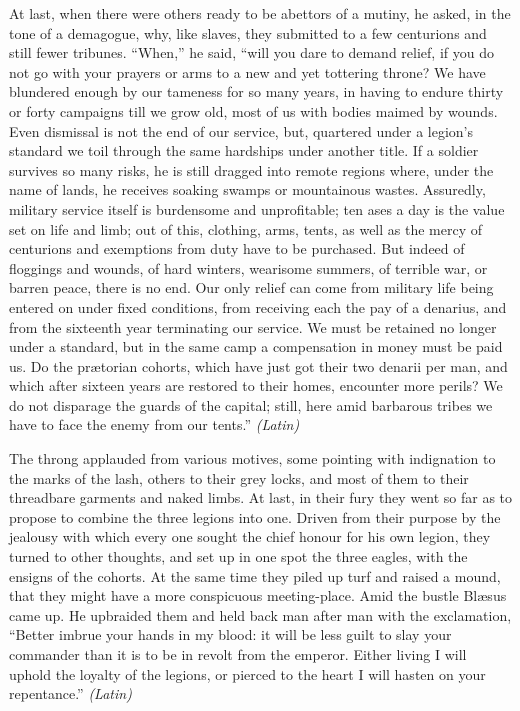 At last, when there were others ready to be abettors of a mutiny, he asked, in the tone of a demagogue, why, like slaves, they submitted to a few centurions and still fewer tribunes. ``When,'' he said, ``will you dare to demand relief, if you do not go with your prayers or arms to a new and yet tottering throne? We have blundered enough by our tameness for so many years, in having to endure thirty or forty campaigns till we grow old, most of us with bodies maimed by wounds. Even dismissal is not the end of our service, but, quartered under a legion's standard we toil through the same hardships under another title. If a soldier survives so many risks, he is still dragged into remote regions where, under the name of lands, he receives soaking swamps or mountainous wastes. Assuredly, military service itself is burdensome and unprofitable; ten ases a day is the value set on life and limb; out of this, clothing, arms, tents, as well as the mercy of centurions and exemptions from duty have to be purchased. But indeed of floggings and wounds, of hard winters, wearisome summers, of terrible war, or barren peace, there is no end. Our only relief can come from military life being entered on under fixed conditions, from receiving each the pay of a denarius, and from the sixteenth year terminating our service. We must be retained no longer under a standard, but in the same camp a compensation in money must be paid us. Do the prætorian cohorts, which have just got their two denarii per man, and which after sixteen years are restored to their homes, encounter more perils? We do not disparage the guards of the capital; still, here amid barbarous tribes we have to face the enemy from our tents.'' \emph{(Latin)}


The throng applauded from various motives, some pointing with indignation to the marks of the lash, others to their grey locks, and most of them to their threadbare garments and naked limbs. At last, in their fury they went so far as to propose to combine the three legions into one. Driven from their purpose by the jealousy with which every one sought the chief honour for his own legion, they turned to other thoughts, and set up in one spot the three eagles, with the ensigns of the cohorts. At the same time they piled up turf and raised a mound, that they might have a more conspicuous meeting-place. Amid the bustle Blæsus came up. He upbraided them and held back man after man with the exclamation, ``Better imbrue your hands in my blood: it will be less guilt to slay your commander than it is to be in revolt from the emperor. Either living I will uphold the loyalty of the legions, or pierced to the heart I will hasten on your repentance.'' \emph{(Latin)}

